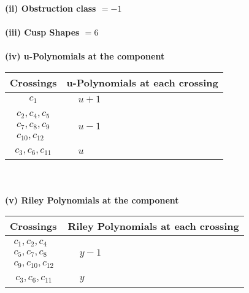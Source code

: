\documentclass[1p]{elsarticle_modified}
\theoremstyle{definition}
\begin{document}
\flushleft \textbf{(ii) Obstruction class $= -1$}\\~\\
\flushleft \textbf{(iii) Cusp Shapes $= 6$}\\~\\
\newpage\renewcommand{\arraystretch}{1}
\flushleft \textbf{(iv) u-Polynomials at the component}\newline \\
\begin{tabular}{m{50pt}|m{274pt}}
Crossings & \hspace{64pt}u-Polynomials at each crossing \\
\hline $$\begin{aligned}c_{1}\end{aligned}$$&$\begin{aligned}
&u+1
\end{aligned}$\\
\hline $$\begin{aligned}c_{2},c_{4},c_{5}\\c_{7},c_{8},c_{9}\\c_{10},c_{12}\end{aligned}$$&$\begin{aligned}
&u-1
\end{aligned}$\\
\hline $$\begin{aligned}c_{3},c_{6},c_{11}\end{aligned}$$&$\begin{aligned}
&u
\end{aligned}$\\
\hline
\end{tabular}\\~\\
\newpage\renewcommand{\arraystretch}{1}
\flushleft \textbf{(v) Riley Polynomials at the component}\newline \\
\begin{tabular}{m{50pt}|m{274pt}}
Crossings & \hspace{64pt}Riley Polynomials at each crossing \\
\hline $$\begin{aligned}c_{1},c_{2},c_{4}\\c_{5},c_{7},c_{8}\\c_{9},c_{10},c_{12}\end{aligned}$$&$\begin{aligned}
&y-1
\end{aligned}$\\
\hline $$\begin{aligned}c_{3},c_{6},c_{11}\end{aligned}$$&$\begin{aligned}
&y
\end{aligned}$\\
\hline
\end{tabular}\\~\\
\end{document}
